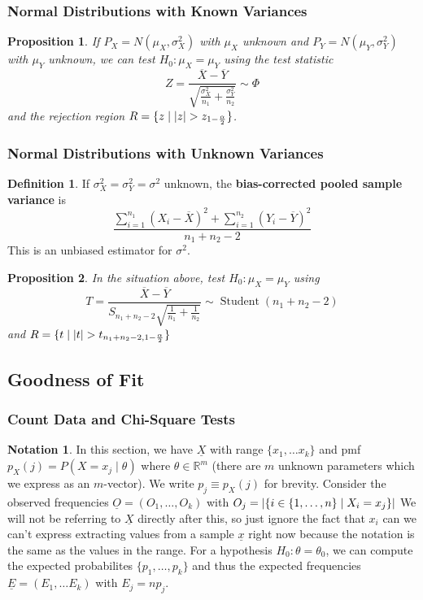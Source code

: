 \documentclass[12pt]{article}
\newtheorem*{prop*}{Proposition}
\theoremstyle{definition}
\newtheorem*{defn*}{Definition}
\newtheorem*{not*}{Notation}
\DeclarePairedDelimiter\abs{\lvert}{\rvert}
\newcommand{\R}{\mathbb{R}}
\DeclareMathOperator{\Student}{Student}
\begin{document}
\subsubsection{Normal Distributions with Known Variances}

\begin{prop*}
  If $P_X = N(\mu_X, \sigma^2_X)$ with $\mu_X$ unknown and $P_Y = N(\mu_Y, \sigma^2_Y)$ with $\mu_Y$ unknown, we can test $H_0 : \mu_X = \mu_Y$ using the test statistic
  $$Z = \frac{\overline{X} - \overline{Y}}{\sqrt{\frac{\sigma^2_X}{n_1} + \frac{\sigma^2_Y}{n_2}}} \sim \Phi$$
  and the rejection region $R = \{z \mid \abs{z} > z_{1 - \frac{\alpha}{2}}\}$.
\end{prop*}

\subsubsection{Normal Distributions with Unknown Variances}

\begin{defn*}
  If $\sigma^2_X = \sigma^2_Y = \sigma^2$ unknown, the \textbf{bias-corrected pooled sample variance} is
  $$\frac{\sum_{i = 1}^{n_1}(X_i - \overline{X})^2 + \sum_{i = 1}^{n_2}(Y_i - \overline{Y})^2}{n_1 + n_2 - 2}$$
  This is an unbiased estimator for $\sigma^2$.
\end{defn*}

\begin{prop*}
  In the situation above, test $H_0 : \mu_X = \mu_Y$ using
  $$T = \frac{\overline{X} - \overline{Y}}{S_{n_1 + n_2 - 2}\sqrt{\frac{1}{n_1} + \frac{1}{n_2}}} \sim \Student(n_1 + n_2 - 2)$$
  and $R = \{t \mid \abs{t} > t_{n_1 + n_2 - 2, 1 - \frac{\alpha}{2}}\}$
\end{prop*}

\subsection{Goodness of Fit}

\subsubsection{Count Data and Chi-Square Tests}

\begin{not*}
  In this section, we have $\underline{X}$ with range $\{x_1, \ldots x_k\}$ and pmf $p_X(j) = P(X = x_j \mid \theta)$ where $\theta \in \R^m$ (there are $m$ unknown parameters which we express as an $m$-vector).
  We write $p_j \equiv p_X(j)$ for brevity.
  Consider the observed frequencies $\underline{O} = (O_1, \ldots, O_k)$ with $O_j = \abs{\{i \in \{1, \ldots, n\} \mid X_i = x_j\}}$
  We will not be referring to $\underline{X}$ directly after this, so just ignore the fact that $x_i$ can we can't express extracting values from a sample $\underline{x}$ right now because the notation is the same as the values in the range.
  For a hypothesis $H_0 : \theta = \theta_0$, we can compute the expected probabilites $\{p_1, \ldots, p_k\}$ and thus the expected frequencies $\underline{E} = (E_1, \ldots E_k)$ with $E_j = np_j$.
\end{not*}
\end{document}
